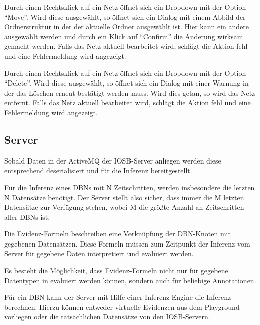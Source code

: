 \documentclass[parskip=full,11pt,twoside]{scrartcl}
\begin{document}
Durch einen Rechtsklick auf ein Netz öffnet sich ein Dropdown mit der Option \enquote{Move}.
Wird diese ausgewählt, so öffnet sich ein Dialog mit einem Abbild der Ordnerstruktur in der der aktuelle Ordner ausgewählt ist. Hier kann ein andere ausgewählt werden und durch ein Klick auf \enquote{Confirm} die Änderung wirksam gemacht werden.
Falls das Netz aktuell bearbeitet wird, schlägt die Aktion fehl und eine Fehlermeldung wird angezeigt.


Durch einen Rechtsklick auf ein Netz öffnet sich ein Dropdown mit der Option \enquote{Delete}. Wird diese ausgewählt, so öffnet sich ein Dialog mit einer Warnung in der das Löschen erneut bestätigt werden muss. Wird dies getan, so wird das Netz entfernt.
Falls das Netz aktuell bearbeitet wird, schlägt die Aktion fehl und eine Fehlermeldung wird angezeigt.

\subsection{Server}


Sobald Daten in der ActiveMQ der IOSB-Server anliegen werden diese entsprechend deserialisiert und für die Inferenz bereitgestellt.

Für die Inferenz eines DBNs mit N Zeitschritten, werden insbesondere die letzten N Datensätze benötigt. Der Server stellt also sicher, dass immer die M letzten Datensätze zur Verfügung stehen, wobei M die größte Anzahl an Zeitschritten aller DBNs ist.

Die Evidenz-Formeln beschreiben eine Verknüpfung der DBN-Knoten mit gegebenen Datensätzen. Diese Formeln müssen zum Zeitpunkt der Inferenz vom Server für gegebene Daten interpretiert und evaluiert werden.

Es besteht die Möglichkeit, dass Evidenz-Formeln nicht nur für gegebene Datentypen in evaluiert werden können, sondern auch für beliebige Annotationen.

Für ein DBN kann der Server mit Hilfe einer Inferenz-Engine die Inferenz berechnen. Hierzu können entweder virtuelle Evidenzen aus dem Playground vorliegen oder die tatsächlichen Datensätze von den IOSB-Servern.
\end{document}
